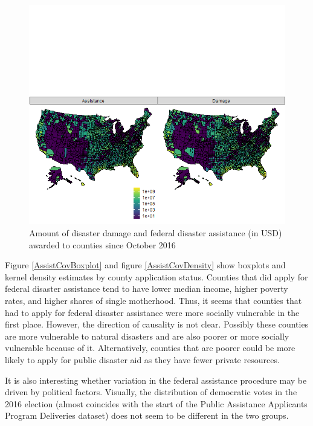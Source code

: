 \begin{figure}[!h]
	\centering
	\includegraphics[scale=0.7]{"../Code & Data/AssistanceMap.png"}
	\caption{Amount of disaster damage and federal disaster assistance (in USD) awarded to counties since October 2016}
	\label{AssistanceMap}
\end{figure}


Figure \ref{AssistCovBoxplot} and figure \ref{AssistCovDensity} show boxplots and kernel density estimates by county application status. Counties that did apply for federal disaster assistance tend to have lower median income, higher poverty rates, and higher shares of single motherhood. Thus, it seems that counties that had to apply for federal disaster assistance were more socially vulnerable in the first place. However, the direction of causality is not clear. Possibly these counties are more vulnerable to natural disasters and are also poorer or more socially vulnerable because of it. Alternatively, counties that are poorer could be more likely to apply for public disaster aid as they have fewer private resources.

It is also interesting whether variation in the federal assistance procedure may be driven by political factors. Visually, the distribution of democratic votes in the 2016 election (almost coincides with the start of the Public Assistance Applicants Program Deliveries dataset) does not seem to be different in the two groups.



